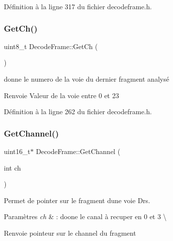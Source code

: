 Définition à la ligne 317 du fichier decodeframe.\+h.

\mbox{\label{class_decode_frame_a9a29ecf0f789fb4afaf0d6fc1fbe9cc2}} 
\subsubsection{\texorpdfstring{Get\+Ch()}{GetCh()}}
{\footnotesize\ttfamily uint8\+\_\+t Decode\+Frame\+::\+Get\+Ch (\begin{DoxyParamCaption}{ }\end{DoxyParamCaption})\hspace{0.3cm}{\ttfamily [inline]}}



donne le numero de la voie du dernier fragment analysé 

\begin{DoxyReturn}{Renvoie}
Valeur de la voie entre 0 et 23 
\end{DoxyReturn}


Définition à la ligne 262 du fichier decodeframe.\+h.

\mbox{\label{class_decode_frame_a7f74abf3aa3facf17363ce6b643700c5}} 
\subsubsection{\texorpdfstring{Get\+Channel()}{GetChannel()}}
{\footnotesize\ttfamily uint16\+\_\+t$\ast$ Decode\+Frame\+::\+Get\+Channel (\begin{DoxyParamCaption}\item[{int}]{ch }\end{DoxyParamCaption})}



Permet de pointer sur le fragment d\textquotesingle{}une voie Drs. 


\begin{DoxyParams}{Paramètres}
{\em ch} & \+: doone le canal à recuper en 0 et 3 \textbackslash{} \\
\hline
\end{DoxyParams}
\begin{DoxyReturn}{Renvoie}
pointeur sur le channel du fragment 
\end{DoxyReturn}
\mbox{\label{class_decode_frame_ab9c8da95989c9d1d3cb7bb28d2ac5811}} 

